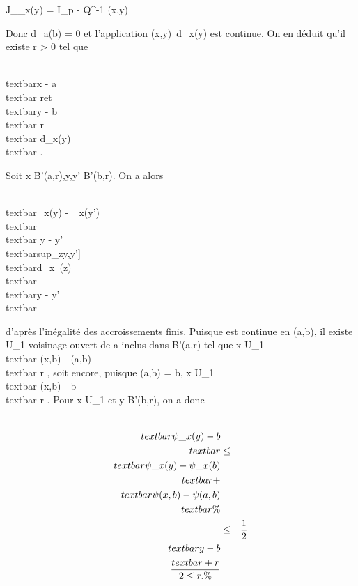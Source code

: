 \documentclass[]{article}
\begin{document}
J\_\psi\_x(y) = I\_p - Q^-1 \cdotQ(x,y)

Donc d\psi\_a(b) = 0 et l'application
(x,y)\mapsto~d\psi\_x(y) est continue. On en
déduit qu'il existe r \textgreater{} 0 tel que

\\textbar{}x - a\\textbar{} \leq
r\text et \\textbar{}y -
b\\textbar{} \leq r \rigtharrow~\\textbar{}
d\psi\_x(y)\\textbar{}   .

Soit x \in B'(a,r),y,y' \in B'(b,r). On a alors

\\textbar{}\psi\_x(y) -
\psi\_x(y')\\textbar{} \leq\\textbar{} y
-
y'\\textbar{}sup\_z\in{[}y,y'{]}\\textbar{}d\psi\_x~(z)\\textbar{}
  \\textbar{}y -
y'\\textbar{}

d'après l'inégalité des accroissements finis. Puisque \psi est continue en
(a,b), il existe U\_1 voisinage ouvert de a inclus dans B'(a,r)
tel que x \in U\_1 \rigtharrow~\\textbar{} \psi(x,b) -
\psi(a,b)\\textbar{} \leq r  , soit
encore, puisque \psi(a,b) = b, x \in U\_1 \rigtharrow~\\textbar{}
\psi(x,b) - b\\textbar{} \leq r  .
Pour x \in U\_1 et y \in B'(b,r), on a donc

\begin{align*}
\\textbar{}\psi\_x(y) -
b\\textbar{}& \leq&
\\textbar{}\psi\_x(y) -
\psi\_x(b)\\textbar{} +\\textbar{}
\psi(x,b) - \psi(a,b)\\textbar{}\%&
\\ & \leq& 1 \over 2
\\textbar{}y - b\\textbar{} + r
\over 2 \leq r. \%& \\
\end{align*}
\end{document}
